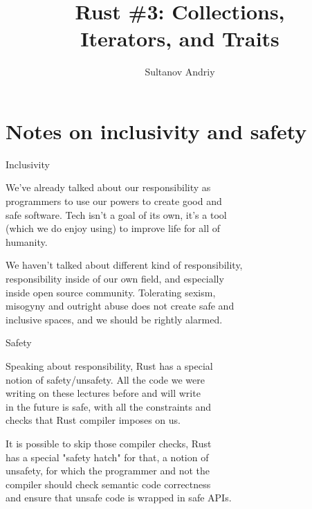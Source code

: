 \documentclass[usenames,dvipsnames,10pt,aspectratio=169]{beamer}
\title[Rust \#3]{Rust \#3: Collections,\\ \vspace{0.1cm}
Iterators, and Traits}
\author[Sultanov Andriy]{Sultanov Andriy}
\institute{APPS@UCU}
\begin{document}
\begin{frame}
\titlepage
\end{frame}

\begin{frame}{\contentsname}
\tableofcontents
\end{frame}


\section{Notes on inclusivity and safety}

\begin{frame}{Inclusivity}
	
\large
We've already talked about our responsibility as\\
programmers to use our powers to create good and\\
safe software. Tech isn't a goal of its own, it's a tool\\
(which we do enjoy using) to improve life for all of\\
humanity.\\

\vspace{0.3cm}

We haven't talked about different kind of responsibility,\\
responsibility inside of our own field, and especially\\
inside open source community. Tolerating sexism,\\
misogyny and outright abuse does not create safe and\\
inclusive spaces, and we should be rightly alarmed.

\end{frame}

\begin{frame}{Safety}

\large
Speaking about responsibility, Rust has a special\\
notion of \textcolor{ucuyellow}{safety/unsafety}. All the code we were\\
writing on these lectures before and will write\\
in the future is \textcolor{ucuyellow}{safe}, with all the constraints and\\
checks that Rust compiler imposes on us.\\

\vspace{0.3cm}

It is possible to skip those compiler checks, Rust\\
has a special "safety hatch" for that, a notion of\\
\textcolor{ucuyellow}{unsafety}, for which the programmer and not the\\
compiler should check semantic code correctness\\
and ensure that unsafe code is wrapped in safe APIs.\\
	
\end{frame}
\end{document}
